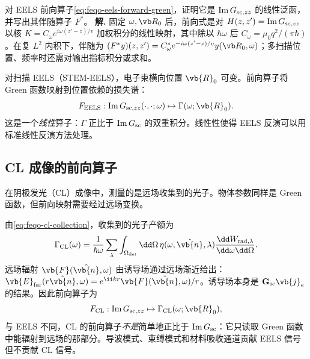 \par
\begin{workedexample}
对 EELS 前向算子\cref{eq:feqo-eels-forward-green}，证明它是 \(\operatorname{Im}G_{{\rm sc},zz}\) 的线性泛函，并写出其伴随算子 \(F^*\)。
\textbf{解.} 固定 \(\omega,\vb R_0\) 后，前向式是对 \(H(z,z')=\operatorname{Im}G_{{\rm sc},zz}\) 以核 \(K=C_\omega e^{i\omega(z'-z)/v}\) 加权积分的线性映射，其中除以 \(\hbar\omega\) 后 \(C_\omega=\mu_0q^2/(\pi\hbar)\)。在复 \(L^2\) 内积下，伴随为 \((F^*y)(z,z')=C_\omega^*e^{-i\omega(z'-z)/v}y(\vb R_0,\omega)\)；多扫描位置、频率时还需对输出指标积分或求和。
\end{workedexample}
\par
对扫描 EELS（STEM-EELS），电子束横向位置 \(\vb{R}_0\) 可变。前向算子将 Green 函数映射到位置依赖的损失谱：
\begin{equation}
F_{\rm EELS}:\operatorname{Im}G_{{\rm sc},zz}(\cdot,\cdot;\omega)
\mapsto\Gamma(\omega;\vb{R}_0).
\label{eq:feqo-eels-forward-map}
\end{equation}
这是一个\emph{线性}算子：\(\Gamma\) 正比于 \(\operatorname{Im}G_{\rm sc}\) 的双重积分。线性性使得 EELS 反演可以用标准线性反演方法处理。

\subsection{CL 成像的前向算子}

在阴极发光（CL）成像中，测量的是远场收集到的光子。物体参数同样是 Green 函数，但前向映射需要经过远场变换。

由\cref{eq:feqo-cl-collection}，收集到的光子产额为
\begin{equation}
\Gamma_{\rm CL}(\omega)=\frac{1}{\hbar\omega}
\sum_\lambda\int_{\Omega_{\rm det}}\dd\Omega\,
\eta(\omega,\hat{\vb{n}},\lambda)
\frac{\dd W_{{\rm rad},\lambda}}{\dd\omega\dd\Omega}.
\label{eq:feqo-cl-forward-collection}
\end{equation}
远场辐射 \(\vb{F}(\hat{\vb{n}},\omega)\) 由诱导场通过远场渐近给出：\(\vb{E}_{\rm far}(r\hat{\vb{n}},\omega)=e^{\ii kr}\vb{F}(\hat{\vb{n}},\omega)/r\)。诱导场本身是 \(\mathbf{G}_{\rm sc}\vb{j}_e\) 的结果。因此前向算子为
\begin{equation}
F_{\rm CL}:\operatorname{Im}G_{{\rm sc},zz}
\mapsto\Gamma_{\rm CL}(\omega;\vb{R}_0),
\label{eq:feqo-cl-forward-map}
\end{equation}
与 EELS 不同，CL 的前向算子\emph{不是}简单地正比于 \(\operatorname{Im}G_{\rm sc}\)：它只读取 Green 函数中能辐射到远场的那部分。导波模式、束缚模式和材料吸收通道贡献 EELS 信号但不贡献 CL 信号。

